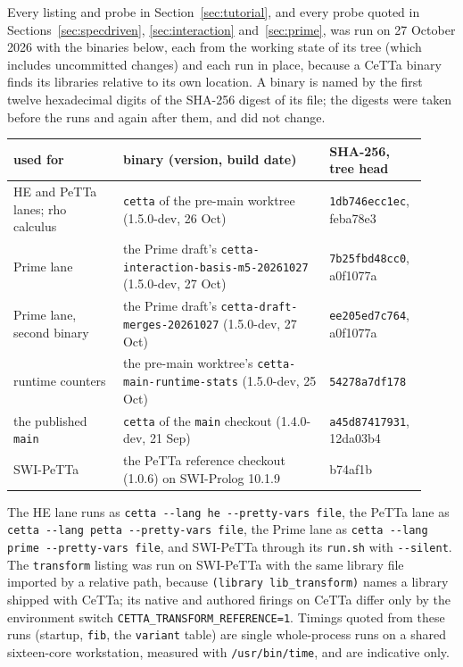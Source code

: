 \documentclass[11pt]{article}
\newcommand{\code}[1]{\texttt{#1}}
\newcommand{\PeTTa}{\textup{PeTTa}}
\newcommand{\HE}{\textup{HE}}
\newcommand{\CeTTa}{\textup{CeTTa}}
\begin{document}
Every listing and probe in Section~\ref{sec:tutorial}, and every probe quoted
in Sections~\ref{sec:specdriven}, \ref{sec:interaction} and~\ref{sec:prime},
was run on 27 October 2026 with the binaries below, each from the working
state of its tree (which includes uncommitted changes) and each run in place,
because a \CeTTa{} binary finds its libraries relative to its own location.
A binary is named by the first twelve hexadecimal digits of the SHA-256 digest
of its file; the digests were taken before the runs and again after them, and
did not change.

\begin{center}
\footnotesize
\begin{tabular}{@{}p{0.25\linewidth}p{0.47\linewidth}p{0.20\linewidth}@{}}
\toprule
used for & binary (version, build date) & SHA-256, tree head \\
\midrule
\HE{} and \PeTTa{} lanes; rho calculus & \code{cetta} of the pre-main worktree (1.5.0-dev, 26 Oct) & \code{1db746ecc1ec}, feba78e3 \\
Prime lane & the Prime draft's \code{cetta-interaction-basis-}\allowbreak\code{m5-20261027} (1.5.0-dev, 27 Oct) & \code{7b25fbd48cc0}, a0f1077a \\
Prime lane, second binary & the Prime draft's \code{cetta-draft-merges-}\allowbreak\code{20261027} (1.5.0-dev, 27 Oct) & \code{ee205ed7c764}, a0f1077a \\
runtime counters & the pre-main worktree's \code{cetta-main-runtime-stats} (1.5.0-dev, 25 Oct) & \code{54278a7df178} \\
the published \code{main} & \code{cetta} of the \code{main} checkout (1.4.0-dev, 21 Sep) & \code{a45d87417931}, 12da03b4 \\
SWI-\PeTTa{} & the \PeTTa{} reference checkout (1.0.6) on SWI-Prolog 10.1.9 & b74af1b \\
\bottomrule
\end{tabular}
\end{center}

\noindent
The \HE{} lane runs as \code{cetta -{}-lang he -{}-pretty-vars file}, the \PeTTa{}
lane as \code{cetta -{}-lang petta -{}-pretty-vars file}, the Prime lane as
\code{cetta -{}-lang prime -{}-pretty-vars file}, and SWI-\PeTTa{} through its
\code{run.sh} with \code{-{}-silent}.  The \code{transform} listing was run on
SWI-\PeTTa{} with the same library file imported by a relative path, because
\code{(library lib\_transform)} names a library shipped with \CeTTa{}; its
native and authored firings on \CeTTa{} differ only by the environment switch
\code{CETTA\_TRANSFORM\_REFERENCE=1}.  Timings quoted from these runs (startup,
\code{fib}, the \code{variant} table) are single whole-process runs on a
shared sixteen-core workstation, measured with \code{/usr/bin/time}, and are
indicative only.
\end{document}
